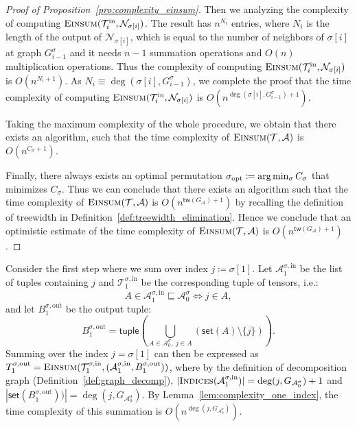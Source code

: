 \documentclass[sn-mathphys, natbib=false]{sn-jnl}
\theoremstyle{plain}
\theoremstyle{definition}
\newcommand{\takesetp}[1]{\mathsf{set}(#1)}
\newcommand{\taketuplep}[1]{\mathsf{tuple}\left( #1 \right)}
\newcommand{\indexset}{\textsc{Indices}}
\newcommand{\tensorcontraction}{\textsc{Einsum}}
\newcommand{\degp}[2]{\deg(#1,#2)}
\newcommand{\treewidthp}[1]{\mathsf{tw}(#1)}
\newcommand{\graphform}[1]{G_{#1}}
\newcommand{\less}{O}
\def\calA{\mathcal{A}}
\def\calT{\mathcal{T}}
\def\calN{\mathcal{N}}
\begin{document}
\begin{bibunit}[agsm]
\begin{proof}[Proof of Proposition~\ref{pro:complexity_einsum}]
Then we analyzing the complexity of computing $\tensorcontraction(\calT_i^{\mathrm{in}},\calN_{\sigma[i]})$. The result has $n^{N_i}$ entries, where $N_i$ is the length of the output of $\calN_{\sigma[i]}$, which is equal to the number of neighbors of $\sigma[i]$ at graph $G^\sigma_{i-1}$ and it needs $n-1$ summation operations and $\less(n)$ multiplication operations. Thus the complexity of computing $\tensorcontraction(\calT_i^{\mathrm{in}},\calN_{\sigma[i]})$ is $O(n^{N_i+1})$. As $N_i \equiv \degp{\sigma[i]}{G^\sigma_{i-1}}$, we complete the proof that the time complexity of computing $\tensorcontraction(\calT_i^{\mathrm{in}},\calN_{\sigma[i]})$ is $\less(n^{\degp{\sigma[i]}{G^\sigma_{i-1}}+1})$.

Taking the maximum complexity of the whole procedure, we obtain that there exists an algorithm, such that the time complexity of $\tensorcontraction(\calT, \calA)$ is $\less(n^{C_\sigma + 1})$.

Finally, there always exists an optimal permutation $\sigma_{\rm opt} \coloneqq \arg \min_{\sigma} C_{\sigma}$ that minimizes $C_\sigma$. Thus we can conclude that there exists an algorithm such that the time complexity of $\tensorcontraction(\calT, \calA)$ is $\less(n^{\treewidthp{G_\calA}+1})$ by recalling the definition of treewidth in Definition~\ref{def:treewidth_elimination}. Hence we conclude that an optimistic estimate of the time complexity of $\tensorcontraction(\calT, \calA)$ is $\less(n^{\treewidthp{G_\calA}+1})$.
\end{proof}
\fi
\iffalse
Consider the first step where we sum over index $j \coloneqq \sigma[1]$. Let $\calA^{\sigma, \mathrm{in}}_{1}$ be the list of tuples containing $j$ and $\calT^{\sigma, \mathrm{in}}_{1}$ be the corresponding tuple of tensors, i.e.:
    \begin{equation*}
    A \in \calA^{\sigma, \mathrm{in}}_{1} \sqsubseteq \calA^{\sigma}_0 \iff j \in A,
    \end{equation*}
    and let $B^{\sigma, \mathrm{out}}_{1}$ be the output tuple: 
    \begin{equation*}
    B^{\sigma, \mathrm{out}}_{1} = \taketuplep{\bigcup_{A \in \calA^{\sigma}_{0},\ j \in A} (\takesetp{A} \setminus \{j\}) }. 
    \end{equation*}
    Summing over the index $j = \sigma[1]$ can then be expressed as $T^{\sigma,\mathrm{out}}_{1} = \tensorcontraction(\calT^{\sigma, \mathrm{in}}_{1}, (\calA^{\sigma, \mathrm{in}}_{1}, B^{\sigma, \mathrm{out}}_{1}))$, where by the definition of decomposition graph (Definition~\ref{def:graph_decomp}), $|\indexset(\calA^{\sigma, \mathrm{in}}_{1})| = \degp{j}{\graphform{\calA^{\sigma}_0}} + 1$ and $|\takesetp{B^{\sigma, \mathrm{out}}_{1})}| = \degp{j}{\graphform{\calA^{\sigma}_0}}$. By Lemma~\ref{lem:complexity_one_index}, the time complexity of this summation is $\less(n^{\degp{j}{\graphform{\calA^{\sigma}_0}}} )$. 
    

\end{bibunit}
\end{document}
